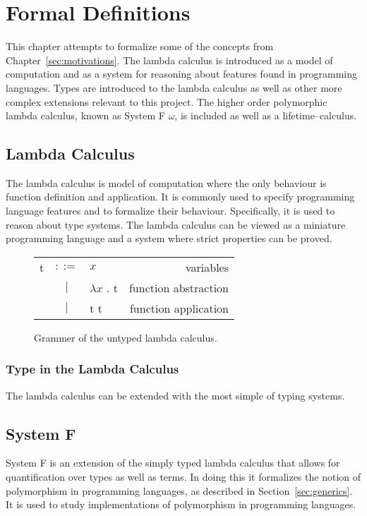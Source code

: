 \chapter{Formal Definitions}\label{sec:formal}
This chapter attempts to formalize some of the concepts from Chapter~\ref{sec:motivations}.
The lambda calculus is introduced as a model of computation and as a system for
reasoning about features found in programming languages. Types are introduced
to the lambda calculus as well as other more complex extensions relevant to
this project. The higher order polymorphic lambda calculus, known as
System F $\omega$, is included as well as a lifetime--calculus.

\section{Lambda Calculus}\label{sec:lambda-calc}
The lambda calculus is model of computation where the only behaviour is
function definition and application. It is commonly used to specify programming
language features and to formalize their behaviour. Specifically, it is used to
reason about type systems. The lambda calculus can be viewed as a miniature
programming language and a system where strict properties can be proved.

\begin{figure}[H]\label{fig:lambda-calc}
    \centering
    \begin{tabular}{l c p{3cm} r}
        t & $ ::= $ & $ x $ &                   variables \\
      & $ | $ & $ \lambda x $ . t &          function abstraction \\
      & $ | $ & t t &          function application \\
    \end{tabular}
    \caption{Grammer of the untyped lambda calculus.}
\end{figure}

\subsection{Type in the Lambda Calculus}
The lambda calculus can be extended with the most simple of typing systems.

\section{System F}
System F is an extension of the simply typed lambda calculus \cite{tapl} that
allows for quantification over types as well as terms. In doing this it
formalizes the notion of polymorphism in programming languages, as described in
Section~\ref{sec:generics}. It is used to study implementations of polymorphism
in programming languages.

